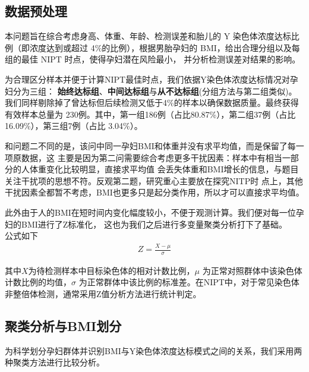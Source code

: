 \documentclass{article}
\begin{document}
\subsection{\textbf{数据预处理}}
本问题旨在综合考虑身高、体重、年龄、检测误差和胎儿的 Y 染色体浓度达标比例（即浓度达到或超过
4\%的比例），根据男胎孕妇的 BMI，给出合理分组以及每组的最佳 NIPT 时点，使得孕妇潜在风险最小，
并分析检测误差对结果的影响。

为合理区分样本并便于计算NIPT最佳时点，我们依据Y染色体浓度达标情况对孕妇分为三组：
\textbf{始终达标组}、\textbf{中间达标组}与\textbf{从不达标组}(分组方法与第二组类似)。
我们同样剔除掉了曾达标但后续检测又低于4\%的样本以确保数据质量。最终获得有效样本总量为
230例。其中，第一组186例（占比80.87\%），第二组37例（占比16.09\%），第三组7例（占比
3.04\%）。

和问题二不同的是，该问中同一孕妇BMI和体重并没有求平均值，而是保留了每一项原数据，这
主要是因为第二问需要综合考虑更多干扰因素：样本中有相当一部分的人体重变化比较明显，直接求平均值
会丢失体重和BMI增长的信息，与题目关注干扰项的思想不符。反观第二题，研究重心主要放在探究NITP时
点上，其他干扰因素全都暂不考虑，BMI也更多只是起分类作用，所以才可以直接求平均值。

此外由于人的BMI在短时间内变化幅度较小，不便于观测计算。我们便对每一位孕妇的BMI进行了Z标准化，
这也为我们之后进行多变量聚类分析打下了基础。\\
公式如下
\begin{gather}
    Z=\frac{X-\mu}{\sigma} \tag{7}
\end{gather}

其中$X$为待检测样本中目标染色体的相对计数比例，$\mu$ 为正常对照群体中该染色体计数比例的均值，$\sigma$
为正常群体中该比例的标准差。在NIPT中，对于常见染色体非整倍体检测，通常采用Z值分析方法进行统计判定。
\subsection{\textbf{聚类分析与BMI划分}}
为科学划分孕妇群体并识别BMI与Y染色体浓度达标模式之间的关系，我们采用两种聚类方法进行比较分析。
\end{document}
